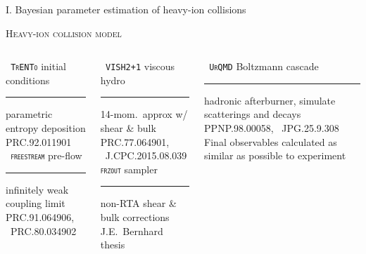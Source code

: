 \documentclass[aspectratio=169]{beamer}
\begin{document}
\begin{frame}
  \begin{center}
    \Large I. Bayesian parameter estimation of heavy-ion collisions
  \end{center}
\end{frame}

\begin{frame}[t]{\scshape Heavy-ion collision model}
  \centering
  \medskip
  \begin{columns}[T]
    \begin{column}{0.3\textwidth}
      \texttt{\scshape\color{theme} TrENTo} {\small initial conditions}\\
      \smallskip\hrule\medskip
      {\scriptsize parametric entropy deposition}\\
      {\tiny \color{theme}PRC.92.011901}\\[2ex]
      \texttt{\scshape\color{theme} freestream} {\small pre-flow}\\
      \smallskip\hrule\medskip
      {\scriptsize infinitely weak coupling limit}\\
      {\tiny \color{theme} PRC.91.064906, ~PRC.80.034902}
    \end{column}
    \hfill
    \begin{column}{0.3\textwidth}
      \texttt{\scshape\color{theme} VISH2+1} {\small viscous hydro}\\
      \smallskip\hrule\medskip
      {\scriptsize 14-mom.\ approx w/ shear \& bulk}\\
      {\tiny \color{theme} PRC.77.064901, ~J.CPC.2015.08.039}\\[2ex]
      \texttt{\scshape\color{theme}frzout} {\small sampler}\\
      \smallskip\hrule\medskip
      {\scriptsize non-RTA shear \& bulk corrections}\\
      {\tiny\color{theme} J.E.\ Bernhard thesis}
    \end{column}
    \hfill
    \begin{column}{0.3\textwidth}
      \texttt{\scshape\color{theme} UrQMD} {\small Boltzmann cascade}
      \smallskip\hrule\medskip
      {\scriptsize hadronic afterburner, simulate scatterings and decays}\\
      {\tiny\color{theme} PPNP.98.00058, ~JPG.25.9.308}\\[2ex]
      {\scriptsize Final observables calculated as similar as possible to experiment}
    \end{column}
  \end{columns}
\end{frame}
\end{document}
